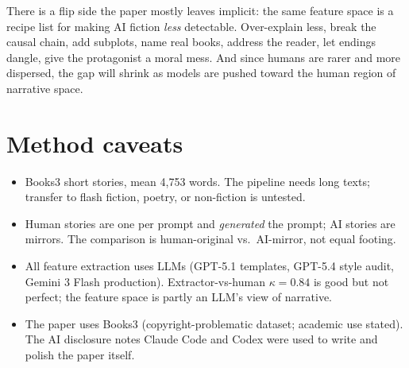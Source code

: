 \documentclass[11pt]{article}
\begin{document}
There is a flip side the paper mostly leaves implicit: the same feature space is a recipe list for making AI fiction \emph{less} detectable. Over-explain less, break the causal chain, add subplots, name real books, address the reader, let endings dangle, give the protagonist a moral mess. And since humans are rarer and more dispersed, the gap will shrink as models are pushed toward the human region of narrative space.

\section{Method caveats}
\begin{itemize}
\item Books3 short stories, mean 4,753 words. The pipeline needs long texts; transfer to flash fiction, poetry, or non-fiction is untested.
\item Human stories are one per prompt and \emph{generated} the prompt; AI stories are mirrors. The comparison is human-original vs.\ AI-mirror, not equal footing.
\item All feature extraction uses LLMs (GPT-5.1 templates, GPT-5.4 style audit, Gemini 3 Flash production). Extractor-vs-human $\kappa=0.84$ is good but not perfect; the feature space is partly an LLM's view of narrative.
\item The paper uses Books3 (copyright-problematic dataset; academic use stated). The AI disclosure notes Claude Code and Codex were used to write and polish the paper itself.
\end{itemize}
\end{document}
